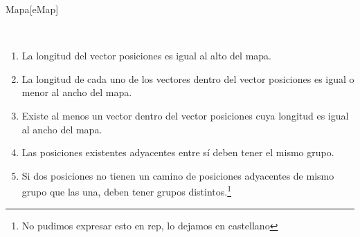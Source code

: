 \begin{Representacion}

	\begin{Estructura}{Mapa}[eMap]
		\begin{Tupla}[eMap]
		\end{Tupla}

		~

		\begin{Tupla}[dataPos]
		\end{Tupla}
	\end{Estructura}

	\begin{enumerate}
	
		\item La longitud del vector posiciones es igual al alto del mapa.
		
		\item La longitud de cada uno de los vectores dentro del vector posiciones es igual o menor al ancho del mapa.

		\item Existe al menos un vector dentro del vector posiciones cuya longitud es igual al ancho del mapa.

		\item Las posiciones existentes adyacentes entre sí deben tener el mismo grupo.
		
		\item Si dos posiciones no tienen un camino de posiciones adyacentes de mismo grupo que las una, deben tener grupos distintos.\footnote{No pudimos expresar esto en rep, lo dejamos en castellano} %
 		
	\end{enumerate}


\end{Representacion}
